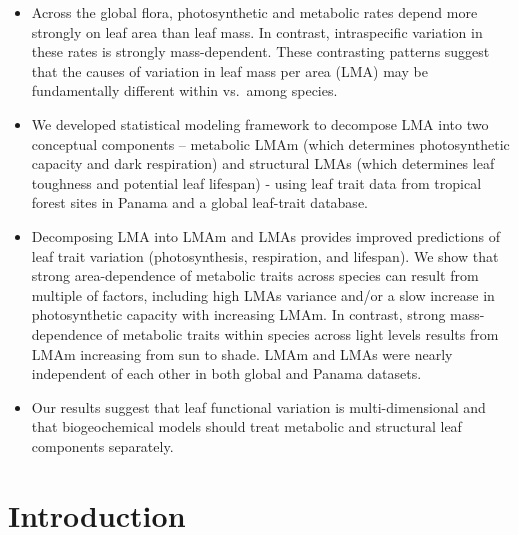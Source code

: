 \documentclass[
  12pt,
  a4paper,
,tablecaptionabove
]{scrartcl}
\begin{document}
\begin{itemize}
\item
  Across the global flora, photosynthetic and metabolic rates depend
  more strongly on leaf area than leaf mass. In contrast, intraspecific
  variation in these rates is strongly mass-dependent. These contrasting
  patterns suggest that the causes of variation in leaf mass per area
  (LMA) may be fundamentally different within vs.~among species.
\item
  We developed statistical modeling framework to decompose LMA into two
  conceptual components -- metabolic LMAm (which determines
  photosynthetic capacity and dark respiration) and structural LMAs
  (which determines leaf toughness and potential leaf lifespan) - using
  leaf trait data from tropical forest sites in Panama and a global
  leaf-trait database.
\item
  Decomposing LMA into LMAm and LMAs provides improved predictions of
  leaf trait variation (photosynthesis, respiration, and lifespan). We
  show that strong area-dependence of metabolic traits across species
  can result from multiple of factors, including high LMAs variance
  and/or a slow increase in photosynthetic capacity with increasing
  LMAm. In contrast, strong mass-dependence of metabolic traits within
  species across light levels results from LMAm increasing from sun to
  shade. LMAm and LMAs were nearly independent of each other in both
  global and Panama datasets.
\item
  Our results suggest that leaf functional variation is
  multi-dimensional and that biogeochemical models should treat
  metabolic and structural leaf components separately.
\end{itemize}

\hypertarget{introduction}{%
\section{Introduction}\label{introduction}}
\end{document}
